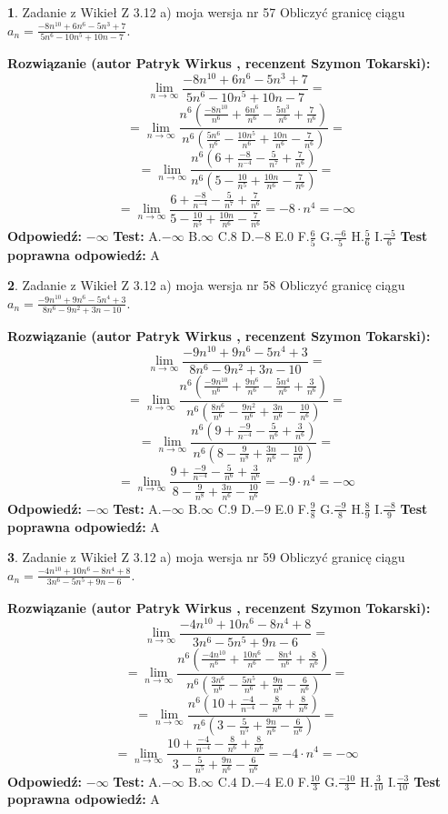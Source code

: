 \documentclass[12pt, a4paper]{article}
\theoremstyle{definition} %
\newtheorem{zad}{}
\newcommand{\zadStart}[1]{\begin{zad}#1\newline}
\newcommand{\zadStop}{\end{zad}}
\newcommand{\rozwStart}[2]{\noindent \textbf{Rozwiązanie (autor #1 , recenzent #2): }\newline}
\newcommand{\rozwStop}{\newline}
\newcommand{\odpStart}{\noindent \textbf{Odpowiedź:}\newline}
\newcommand{\odpStop}{\newline}
\newcommand{\testStart}{\noindent \textbf{Test:}\newline}
\newcommand{\testStop}{\newline}
\newcommand{\kluczStart}{\noindent \textbf{Test poprawna odpowiedź:}\newline}
\newcommand{\kluczStop}{\newline}
\begin{document}
\zadStart{Zadanie z Wikieł Z 3.12 a) moja wersja nr 57}
Obliczyć granicę ciągu $a_{n}=\frac{-8n^{10}+6n^{6}-5n^{3}+7}{5n^{6}-10n^{5}+10n-7}$.
\zadStop
\rozwStart{Patryk Wirkus}{Szymon Tokarski}
$$\lim\limits_{n\to\infty}\frac{-8n^{10}+6n^{6}-5n^{3}+7}{5n^{6}-10n^{5}+10n-7}=$$
$$=\lim\limits_{n\to\infty}\frac{n^{6}\left(\frac{-8n^{10}}{n^{6}}+\frac{6n^{6}}{n^{6}}-\frac{5n^{3}}{n^{6}}+\frac{7}{n^{6}}\right)}{n^{6}\left(\frac{5n^{6}}{n^{6}}-\frac{10n^{5}}{n^{6}}+\frac{10n}{n^{6}}-\frac{7}{n^{6}}\right)}=$$
$$=\lim\limits_{n\to\infty}\frac{n^{6}\left(6+\frac{-8}{n^{-4}}-\frac{5}{n^{7}}+\frac{7}{n^{6}}\right)}
{n^{6}\left(5-\frac{10}{n^{5}}+\frac{10n}{n^{6}}-\frac{7}{n^{6}}\right)}=$$
$$=\lim\limits_{n\to\infty}\frac{6+\frac{-8}{n^{-4}}-\frac{5}{n^{7}}+\frac{7}{n^{6}}}{5-\frac{10}{n^{5}}+\frac{10n}{n^{6}}-\frac{7}{n^{6}}}=-8\cdot n^{4} = -\infty$$
\rozwStop
\odpStart
$-\infty$
\odpStop
\testStart
A.$-\infty$
B.$\infty$
C.$8$
D.$-8$
E.$0$
F.$\frac{6}{5}$
G.$\frac{-6}{5}$
H.$\frac{5}{6}$
I.$\frac{-5}{6}$
\testStop
\kluczStart
A
\kluczStop



\zadStart{Zadanie z Wikieł Z 3.12 a) moja wersja nr 58}
Obliczyć granicę ciągu $a_{n}=\frac{-9n^{10}+9n^{6}-5n^{4}+3}{8n^{6}-9n^{2}+3n-10}$.
\zadStop
\rozwStart{Patryk Wirkus}{Szymon Tokarski}
$$\lim\limits_{n\to\infty}\frac{-9n^{10}+9n^{6}-5n^{4}+3}{8n^{6}-9n^{2}+3n-10}=$$
$$=\lim\limits_{n\to\infty}\frac{n^{6}\left(\frac{-9n^{10}}{n^{6}}+\frac{9n^{6}}{n^{6}}-\frac{5n^{4}}{n^{6}}+\frac{3}{n^{6}}\right)}{n^{6}\left(\frac{8n^{6}}{n^{6}}-\frac{9n^{2}}{n^{6}}+\frac{3n}{n^{6}}-\frac{10}{n^{6}}\right)}=$$
$$=\lim\limits_{n\to\infty}\frac{n^{6}\left(9+\frac{-9}{n^{-4}}-\frac{5}{n^{6}}+\frac{3}{n^{6}}\right)}
{n^{6}\left(8-\frac{9}{n^{8}}+\frac{3n}{n^{6}}-\frac{10}{n^{6}}\right)}=$$
$$=\lim\limits_{n\to\infty}\frac{9+\frac{-9}{n^{-4}}-\frac{5}{n^{6}}+\frac{3}{n^{6}}}{8-\frac{9}{n^{8}}+\frac{3n}{n^{6}}-\frac{10}{n^{6}}}=-9\cdot n^{4} = -\infty$$
\rozwStop
\odpStart
$-\infty$
\odpStop
\testStart
A.$-\infty$
B.$\infty$
C.$9$
D.$-9$
E.$0$
F.$\frac{9}{8}$
G.$\frac{-9}{8}$
H.$\frac{8}{9}$
I.$\frac{-8}{9}$
\testStop
\kluczStart
A
\kluczStop



\zadStart{Zadanie z Wikieł Z 3.12 a) moja wersja nr 59}
Obliczyć granicę ciągu $a_{n}=\frac{-4n^{10}+10n^{6}-8n^{4}+8}{3n^{6}-5n^{5}+9n-6}$.
\zadStop
\rozwStart{Patryk Wirkus}{Szymon Tokarski}
$$\lim\limits_{n\to\infty}\frac{-4n^{10}+10n^{6}-8n^{4}+8}{3n^{6}-5n^{5}+9n-6}=$$
$$=\lim\limits_{n\to\infty}\frac{n^{6}\left(\frac{-4n^{10}}{n^{6}}+\frac{10n^{6}}{n^{6}}-\frac{8n^{4}}{n^{6}}+\frac{8}{n^{6}}\right)}{n^{6}\left(\frac{3n^{6}}{n^{6}}-\frac{5n^{5}}{n^{6}}+\frac{9n}{n^{6}}-\frac{6}{n^{6}}\right)}=$$
$$=\lim\limits_{n\to\infty}\frac{n^{6}\left(10+\frac{-4}{n^{-4}}-\frac{8}{n^{6}}+\frac{8}{n^{6}}\right)}
{n^{6}\left(3-\frac{5}{n^{5}}+\frac{9n}{n^{6}}-\frac{6}{n^{6}}\right)}=$$
$$=\lim\limits_{n\to\infty}\frac{10+\frac{-4}{n^{-4}}-\frac{8}{n^{6}}+\frac{8}{n^{6}}}{3-\frac{5}{n^{5}}+\frac{9n}{n^{6}}-\frac{6}{n^{6}}}=-4\cdot n^{4} = -\infty$$
\rozwStop
\odpStart
$-\infty$
\odpStop
\testStart
A.$-\infty$
B.$\infty$
C.$4$
D.$-4$
E.$0$
F.$\frac{10}{3}$
G.$\frac{-10}{3}$
H.$\frac{3}{10}$
I.$\frac{-3}{10}$
\testStop
\kluczStart
A
\kluczStop
\end{document}
